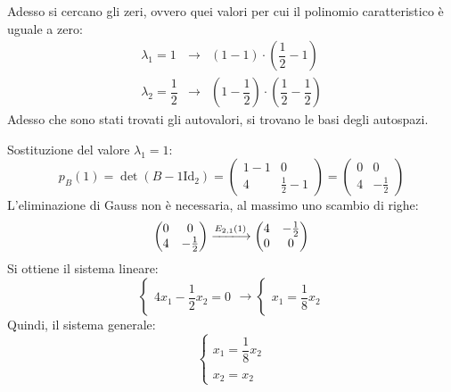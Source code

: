 \documentclass[a4paper]{article}
\begin{document}
	Adesso si cercano gli zeri, ovvero quei valori per cui il polinomio caratteristico è uguale a zero:
	\begin{equation*}
		\begin{array}{lll}
			\lambda_{1} = 1				&\longrightarrow& \left(1-1\right) \cdot \left(\dfrac{1}{2}-1\right) \\ [2em]
			\lambda_{2} = \dfrac{1}{2}	&\longrightarrow& \left(1-\dfrac{1}{2}\right) \cdot \left(\dfrac{1}{2}-\dfrac{1}{2}\right)
		\end{array}
	\end{equation*}
	Adesso che sono stati trovati gli autovalori, si trovano le basi degli autospazi.\newpage

	\noindent
	Sostituzione del valore $\lambda_{1} = 1$:
	\begin{equation*}
		p_{B}\left(1\right) = \det\left(B - 1\mathrm{Id}_{2}\right) = 
		\begin{pmatrix}
			1-1 & 0 \\
			4 & \frac{1}{2}-1
		\end{pmatrix} = \begin{pmatrix}
			0 & 0 \\
			4 & -\frac{1}{2}
		\end{pmatrix}
	\end{equation*}
	L'eliminazione di Gauss non è necessaria, al massimo uno scambio di righe:
	\begin{equation*}
		\begin{pmatrix}
			0 & 0 \\
			4 & -\frac{1}{2}
		\end{pmatrix}
		\xlongrightarrow{E_{2,1}\left(1\right)}
		\begin{pmatrix}
			4 & -\frac{1}{2} \\
			0 & 0
		\end{pmatrix}
	\end{equation*}
	Si ottiene il sistema lineare:
	\begin{equation*}
		\begin{cases}
			4x_{1} - \dfrac{1}{2}x_{2} = 0
		\end{cases}
		\longrightarrow
		\begin{cases}
			x_{1} = \dfrac{1}{8}x_{2}
		\end{cases}
	\end{equation*}
	Quindi, il sistema generale:
	\begin{equation*}
		\begin{cases}
			x_{1} = \dfrac{1}{8}x_{2} \\
			\\
			x_{2} = x_{2}
		\end{cases}
	\end{equation*}
\end{document}
